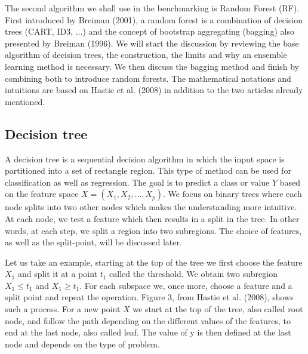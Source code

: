 \documentclass[a4paper,12pt]{article}
\numberwithin{equation}{section}
\begin{document}
The second algorithm we shall use in the benchmarking is Random Forest (RF). First introduced by Breiman (2001), a random forest is a combination of decision trees (CART, ID3, ...) and the concept of bootstrap aggregating (bagging) also presented by Breiman (1996). We will start the discussion by reviewing the base algorithm of decision trees, the construction, the limits and why an ensemble learning method is necessary. We then discuss the bagging method and finish by combining both to introduce random forests. The mathematical notations and intuitions are based on Hastie et al. (2008) in addition to the two articles already mentioned.

\subsection{Decision tree}

A decision tree is a sequential decision algorithm in which the input space is partitioned into a set of rectangle region. This type of method can be used for classification as well as regression. The goal is to predict a class or value $Y$ based on the feature space $X = (X_1,X_2,...,X_p)$. We focus on binary trees where each node splits into two other nodes which makes the understanding more intuitive. At each node, we test a feature which then results in a split in the tree. In other words, at each step, we split a region into two subregions. The choice of features, as well as the split-point, will be discussed later. \par
Let us take an example, starting at the top of the tree we first choose the feature $X_1$ and split it at a point $t_1$ called the threshold. We obtain two subregion $X_1 \leq t_1$ and $X_1 \ge t_1$. For each subspace we, once more, choose a feature and a split point and repeat the operation. Figure 3, from Hastie et al. (2008), shows such a process. For a new point $X$ we start at the top of the tree, also called root node, and follow the path depending on the different values of the features, to end at the last node, also called leaf. The value of y is then defined at the last node and depends on the type of problem. 
\end{document}
